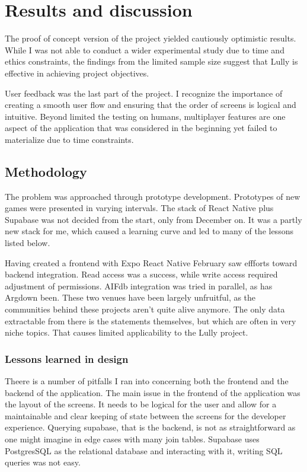\documentclass{article}
\begin{document}
\newpage

\chapter{Results and discussion}

The proof of concept version of the  project yielded cautiously optimistic results. While I was not able to conduct a wider experimental study due to time and ethics constraints, the findings from the limited sample size suggest that Lully is effective in achieving project objectives. 

User feedback was the last part of the project. I recognize the importance of creating a smooth user flow and ensuring that the order of screens is logical and intuitive. Beyond limited the testing on humans, multiplayer features are one aspect of the application that was considered in the beginning yet failed to materialize due to time constraints. 

\section{Methodology}
The problem was approached through prototype development. Prototypes of new games were presented in varying intervals. The stack of React Native plus Supabase was not decided from the start, only from December on. It was a partly new stack for me, which caused a learning curve and led to many of the lessons listed below.

Having created a frontend with Expo React Native February saw effforts toward backend integration. Read access was a success, while write access required adjustment of permissions. AIFdb integration was tried in parallel, as has Argdown been. These two venues have been largely unfruitful, as the communities behind these projects aren't quite alive anymore. The only data extractable from there is the statements themselves, but which are often in very niche topics. That causes limited applicability to the Lully project. 

\subsection{Lessons learned in design}
Theere is a number of pitfalls I ran into concerning both the frontend and the backend of the application. The main issue in the frontend of the application was the layout of the screens. It needs to be logical for the user and allow for a maintainable and clear keeping of state between the screens for the developer experience. Querying supabase, that is the backend, is not as straightforward as one might imagine in edge cases with many join tables. Supabase uses PostgresSQL as the relational database and interacting with it, writing SQL queries was not easy. 
\end{document}
